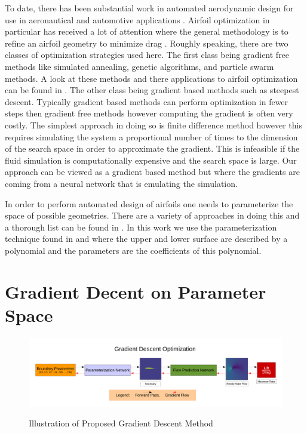 \documentclass{article} %
\begin{document}
To date, there has been substantial work in automated aerodynamic design for use in aeronautical and automotive applications \citep{ando2010automotive} \citep{anderson2015adaptive}. Airfoil optimization in particular has received a lot of attention where the general methodology is to refine an airfoil geometry to minimize drag \citep{drela1998pros} \citep{koziel2013multi}. Roughly speaking, there are two classes of optimization strategies used here. The first class being gradient free methods like simulated annealing, genetic algorithms, and particle swarm methods. A look at these methods and there applications to airfoil optimization can be found in \citet{mukesh2012application}. The other class being gradient based methods such as steepest descent. Typically gradient based methods can perform optimization in fewer steps then gradient free methods however computing the gradient is often very costly. The simplest approach in doing so is finite difference method however this requires simulating the system a proportional number of times to the dimension of the search space in order to approximate the gradient. This is infeasible if the fluid simulation is computationally expensive and the search space is large. Our approach can be viewed as a gradient based method but where the gradients are coming from a neural network that is emulating the simulation.

In order to perform automated design of airfoils one needs to parameterize the space of possible geometries. There are a variety of approaches in doing this and a thorough list can be found in \citet{salunke2014airfoil}. In this work we use the parameterization technique found in \citet{lane2009surface} and \citet{hilton2007universal} where the upper and lower surface are described by a polynomial and the parameters are the coefficients of this polynomial.

\section{Gradient Decent on Parameter Space}

\begin{figure}[h]
\begin{center}
\includegraphics[scale=0.34]{./gradient_descent_optimization.pdf}
\label{gradient_descent_optimization}
\end{center}
\caption{Illustration of Proposed Gradient Descent Method}
\end{figure}
\end{document}
